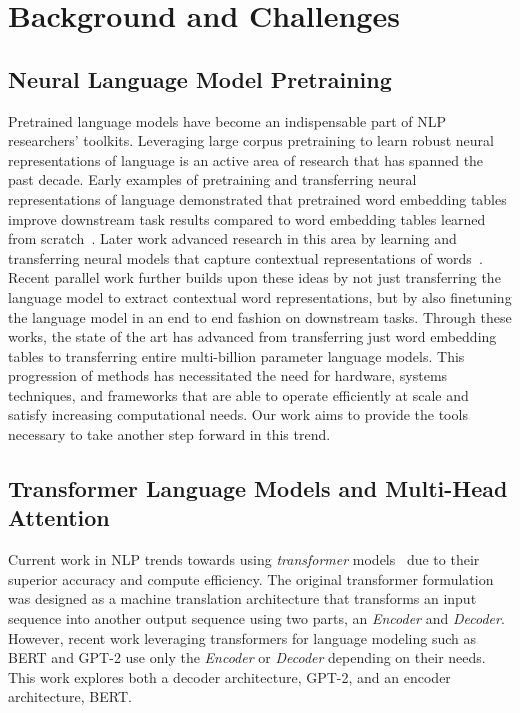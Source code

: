 \documentclass{article}
\begin{document}
 \section{Background and Challenges}
\subsection{Neural Language Model Pretraining} 

Pretrained language models have become an indispensable part of NLP researchers' toolkits. Leveraging large corpus pretraining to learn robust neural representations of language is an active area of research that has spanned the past decade. Early examples of pretraining and transferring neural representations of language demonstrated that pretrained word embedding tables improve downstream task results compared to word embedding tables learned from scratch~\cite{Mikolov2013,Pennington2014,Turian2010}. 
Later work advanced research in this area by learning and transferring neural models that capture contextual representations of words~\citep{context2vec, Cove, ELMo, Radford2017Sentiment, Radford2019GPT2}. Recent parallel work \citep{Le2016seq2seqtransfer, Howard2018ULMFIT, Radford2018GPT, devlin2018bert, roberta, transformerxl,xlnet,mtdnn,ALBERT2019} further builds upon these ideas by not just transferring the language model to extract contextual word representations, but by also finetuning the language model in an end to end fashion on downstream tasks. Through these works, the state of the art has advanced from transferring just word embedding tables to transferring entire multi-billion parameter language models. This progression of methods has necessitated the need for hardware, systems techniques, and frameworks that are able to operate efficiently at scale and satisfy increasing computational needs. Our work aims to provide the tools necessary to take another step forward in this trend.

\subsection{Transformer Language Models and Multi-Head Attention} 

Current work in NLP trends towards using {\it transformer} models~\cite{Transformer} due to their superior accuracy and compute efficiency. The original transformer formulation was designed as a machine translation architecture that transforms an input sequence into another output sequence using two parts, an {\it Encoder} and {\it Decoder}. However, recent work leveraging transformers for language modeling such as BERT \cite{devlin2018bert} and GPT-2 \cite{Radford2019GPT2} use only the {\it Encoder} or {\it Decoder} depending on their needs. This work explores both a decoder architecture, GPT-2, and an encoder architecture, BERT. 
\end{document}
